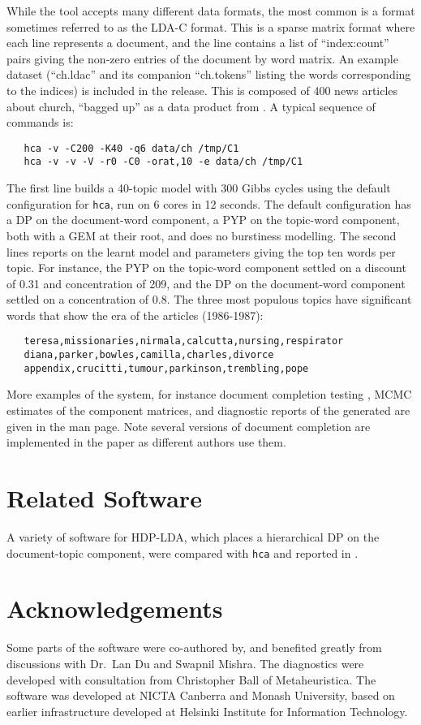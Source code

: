 \documentclass[twoside,11pt]{article}
\begin{document}
While the tool accepts many different data formats, the
most common is a format sometimes referred to as the LDA-C format.
This is a sparse matrix format where each line represents a document,
and the line contains a list of ``index:count'' pairs giving the
non-zero entries of the document by word matrix.  An example dataset
(``ch.ldac'' and its companion ``ch.tokens'' listing the words
corresponding to the indices) is included in the release.
This is composed of 400 news articles about church, ``bagged up''
as a data product from \cite{Lewis:2004}.
A typical sequence of commands is:
\begin{verbatim}
   hca -v -C200 -K40 -q6 data/ch /tmp/C1
   hca -v -v -V -r0 -C0 -orat,10 -e data/ch /tmp/C1
\end{verbatim}
The first line builds a 40-topic model with 300 Gibbs cycles
using the default configuration
for {\tt hca}, run on 6 cores in 12 seconds.
The default configuration has a DP on the document-word component,
a PYP on the topic-word component,
both with a GEM at their root, and does no burstiness modelling.
The second lines reports on the learnt model and parameters
giving the top ten words per topic.
For instance, the PYP on the topic-word
component settled on a discount of 0.31 and concentration of 209,
and the DP on the document-word component settled on a concentration of 0.8.
The three most populous topics have significant words that show the
era of the articles (1986-1987):
\begin{verbatim}
   teresa,missionaries,nirmala,calcutta,nursing,respirator
   diana,parker,bowles,camilla,charles,divorce
   appendix,crucitti,tumour,parkinson,trembling,pope
\end{verbatim}
More examples of the system, for instance document completion
testing \cite{Buntine09},
MCMC estimates of the component matrices,
and diagnostic reports of the generated 
are given in the man page.
Note several versions of document completion are implemented
in the paper as different authors use them.

\section{Related Software}

A variety of software for HDP-LDA, which places a
hierarchical DP on the document-topic component,
were compared with {\tt hca} and reported in
\cite{buntinemishra14}.



\section*{Acknowledgements}
{Some parts of the software were co-authored by, and benefited greatly
  from discussions with Dr.\ Lan Du and Swapnil Mishra.
  The diagnostics were developed with consultation from Christopher Ball of
  Metaheuristica.
  The software was developed at NICTA Canberra and Monash University,
  based on earlier infrastructure developed at
  Helsinki Institute for Information Technology.
}



\end{document}
